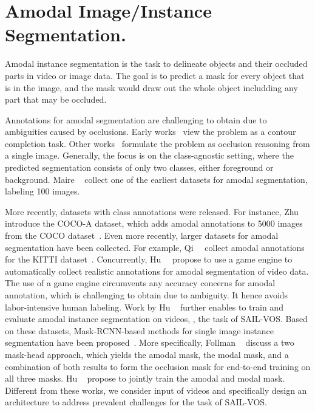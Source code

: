 \section{Amodal Image/Instance Segmentation.}
Amodal instance segmentation is the task to delineate objects and their occluded parts in video or image data. The goal is to predict a mask for every object that is in the image, and the mask would draw out the whole object includding any part that may be occluded. 

Annotations for amodal segmentation are challenging to obtain due to  ambiguities caused by  occlusions. Early works~\cite{GuoECCV2012, GuptaCVPR2013, SilbermanECCV2014b, KarICCV2015} view the problem as a contour completion task. Other works~\cite{HsiaoCVPR2012, PepikCVPR2013, GhiasiCVPR2014, ChenCVPR2015, LiECCV2016}  formulate the problem as occlusion reasoning from a single image. Generally, the focus is on the class-agnostic setting, where the predicted segmentation consists of only two classes, either foreground or background. Maire \etal~\cite{maire2013hierarchical} collect one of the earliest datasets for amodal segmentation, labeling 100 images. %

More recently, datasets with class annotations were released. For instance, Zhu~\etal~\cite{zhu2017semantic} introduce the COCO-A dataset, which adds amodal annotations to 5000  images from the COCO dataset~\cite{lin2014microsoft}. Even more recently, larger datasets for amodal segmentation have been collected. For example, Qi~\etal~\cite{qi2019amodal} collect amodal annotations for the KITTI dataset~\cite{geiger2012we}. Concurrently, Hu~\etal~\cite{hu2019sail} propose to use a game engine to automatically collect realistic  annotations for amodal segmentation of video data. The use of a game engine circumvents any accuracy concerns for amodal annotation, which is %
challenging to obtain due to ambiguity. It hence avoids labor-intensive human labeling. Work by Hu \etal~\cite{hu2019sail} further enables to train and evaluate amodal instance segmentation on videos, \ie, the task of SAIL-VOS. Based on these datasets, Mask-RCNN-based methods for single image instance segmentation have been proposed~\cite{follmann2019learning, hu2019sail}. More specifically, Follman \etal~\cite{follmann2019learning} discuss a two mask-head approach, which yields the amodal mask, the modal mask, and a combination of both results to form the occlusion mask for end-to-end training on all three masks. Hu \etal~\cite{hu2019sail} propose to jointly train the amodal and modal mask. Different from these works, we consider input of videos and specifically design an architecture to address prevalent challenges for the task of SAIL-VOS.


